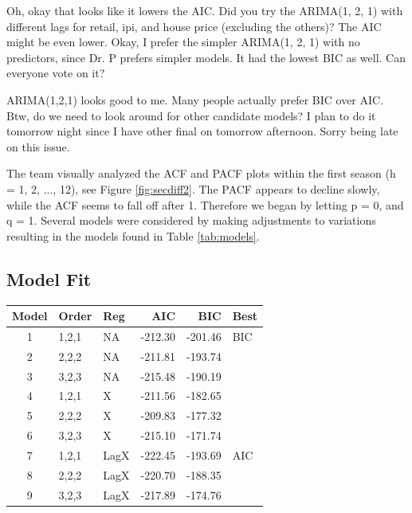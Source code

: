 \documentclass[twoside,twocolumn]{article}
\begin{document}
Oh, okay that looks like it lowers the AIC. Did you try the ARIMA(1, 2, 1) with different lags for retail, ipi, and house price (excluding the others)? The AIC might be even lower.
Okay, I prefer the simpler ARIMA(1, 2, 1) with no predictors, since Dr. P prefers simpler models. It had the lowest BIC as well. Can everyone vote on it?

ARIMA(1,2,1) looks good to me. Many people actually prefer BIC over AIC. Btw, do we need to look around for other candidate models? I plan to do it tomorrow night since I have other final on tomorrow afternoon. Sorry being late on this issue.


      
      The team visually analyzed the ACF and PACF plots within the first season (h = 1, 2, ..., 12), see Figure \ref{fig:secdiff2}. The PACF appears to decline slowly, while the ACF seems to fall off after 1. Therefore we began by letting p = 0, and q = 1. Several models were considered by making adjustments to variations resulting in the models found in Table \ref{tab:models}.\newline
      
      \subsection{Model Fit}
      
\begin{table}[ht]
\centering
\begin{tabular}{cllrrl}
  \hline
 Model & Order & Reg  & AIC & BIC & Best \\ 
  \hline
1 & 1,2,1 &  NA &   -212.30 & -201.46 & BIC \\ 
  2  & 2,2,2 & NA   & -211.81 & -193.74 &  \\ 
  3  & 3,2,3 &  NA  & -215.48 & -190.19 &  \\ 
  4  & 1,2,1 & X  & -211.56 & -182.65 &  \\ 
  5  & 2,2,2 & X   & -209.83 & -177.32 &  \\ 
  6  & 3,2,3 & X   & -215.10 & -171.74 &  \\ 
  7  & 1,2,1 &  LagX & -222.45 & -193.69 & AIC \\ 
  8  & 2,2,2 &  LagX & -220.70 & -188.35 &  \\ 
  9  & 3,2,3 &  LagX & -217.89 & -174.76 &  \\ 
   \hline
\end{tabular}
\end{table}
\end{document}
